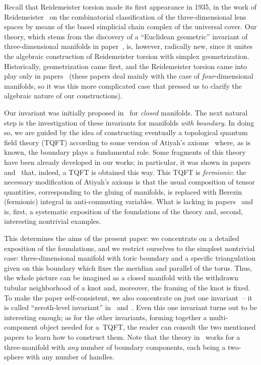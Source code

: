 \documentclass[pdftex]{sigma}
\begin{document}
Recall that Reidemeister torsion made its f\/irst appearance in 1935, in the work of Reidemeister~\cite{Reidemeister} on  the combinatorial classif\/ication of the three-dimensional lens spaces by means of the based simplicial chain complex of the universal cover. Our theory, which stems from the discovery of a ``Euclidean geometric'' invariant of three-dimensional manifolds in paper~\cite{JNMP1}, is, however, radically new, since it unites the algebraic construction of Reidemeister torsion with simplex geometrization. Historically, geometrization came f\/irst, and the Reidemeister torsion came into play only in papers~\cite{TMP24,TMP15} (these papers deal mainly with the case of \emph{four}-dimensional manifolds, so it was this more complicated case that pressed us to clarify the algebraic nature of our constructions).

Our invariant was initially proposed in~\cite{JNMP1} for \emph{closed} manifolds. The next natural step is the investigation of these invariants for manifolds \emph{with boundary}. In doing so, we are guided by the idea of constructing eventually a topological quantum f\/ield theory (TQFT) according to some version of Atiyah's axioms~\cite{A} where, as is known, the boundary plays a fundamental role. Some fragments of this theory have been already developed in our works; in particular, it was shown in papers~\cite{korepanov-2009-1} and~\cite{korepanov-2009-2} that, indeed, a TQFT is obtained this way. This TQFT is \emph{fermionic}: the necessary modif\/ication of Atiyah's axioms is that the usual composition of tensor quantities, corresponding to the gluing of manifolds, is replaced with Berezin (fermionic) integral in anti-commuting variables. What is lacking in papers~\cite{korepanov-2009-1} and~\cite{korepanov-2009-2} is, f\/irst, a systematic exposition of the foundations of the theory and, second, interesting nontrivial examples.

This determines the aims of the present paper: we concentrate on a detailed exposition of the foundations, and we restrict ourselves to the simplest nontrivial case: three-dimensional manifold with toric boundary and a specif\/ic triangulation given on this boundary which f\/ixes the meridian and parallel of the torus. Thus, the whole picture can be imagined as a closed manifold with the withdrawn tubular neighborhood of a knot and, moreover, the framing of the knot is f\/ixed. To make the paper self-consistent, we also concentrate on just one invariant~-- it is called ``zeroth-level invariant'' in~\cite{korepanov-2009-1} and~\cite{korepanov-2009-2}. Even this one invariant turns out to be interesting enough; as for the other invariants, forming together a multi-component object needed for a~TQFT, the reader can consult the two mentioned papers to learn how to construct them. Note that the theory in~\cite{korepanov-2009-2} works for a three-manifold with \emph{any} number of boundary components, each being a two-sphere with any number of handles.
\end{document}
